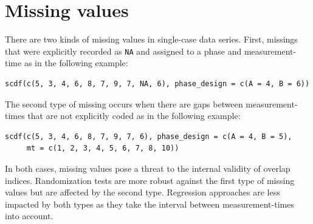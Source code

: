 \documentclass[
]{book}
\begin{document}
\hypertarget{missing-values}{%
\section{Missing values}\label{missing-values}}

There are two kinds of missing values in single-case data series. First, missings that were explicitly recorded as \texttt{NA} and assigned to a phase and measurement-time as in the following example:

\begin{verbatim}
scdf(c(5, 3, 4, 6, 8, 7, 9, 7, NA, 6), phase_design = c(A = 4, B = 6))
\end{verbatim}

The second type of missing occurs when there are gaps between measurement-times that are not explicitly coded as in the following example:

\begin{verbatim}
scdf(c(5, 3, 4, 6, 8, 7, 9, 7, 6), phase_design = c(A = 4, B = 5), 
     mt = c(1, 2, 3, 4, 5, 6, 7, 8, 10))
\end{verbatim}

In both cases, missing values pose a threat to the internal validity of overlap indices. Randomization tests are more robust against the first type of missing values but are affected by the second type. Regression approaches are less impacted by both types as they take the interval between measurement-times into account.
\end{document}
